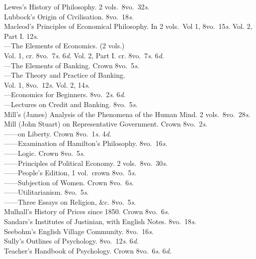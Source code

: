 \documentclass[letterpaper,12pt,oneside,openany]{memoir}
\newcommand{\D}{\hspace*{5mm}}
\newcommand{\E}{\hspace*{2mm}---\hspace*{2mm}}
\begin{document}
\begin{footnotesize}
Lewes's History of Philosophy. 2 vols.\ 8vo.\ 32\textit{s}.\\
Lubbock's Origin of Civilisation. 8vo.\ 18\textit{s}.\\
Macleod's Principles of Economical Philosophy. In 2 vols.\ Vol 1, 8vo.\ 15\textit{s}. Vol. 2, Part I. 12\textit{s}.\\
\E The Elements of Economics. (2 vols.)\\
\D\D Vol. 1, cr. 8vo.\ 7\textit{s}. 6\textit{d}. Vol. 2, Part I. cr. 8vo.\ 7\textit{s}. 6\textit{d}.\\
\E The Elements of Banking. Crown 8vo.\ 5\textit{s}.\\
\E The Theory and Practice of Banking.\\
\D\D Vol. 1, 8vo.\ 12\textit{s}. Vol. 2, 14\textit{s}.\\
\E Economics for Beginners. 8vo.\ 2\textit{s}. 6\textit{d}.\\
\E Lectures on Credit and Banking. 8vo.\ 5\textit{s}.\\
Mill's (James) Analysis of the Phenomena of the Human Mind. 2 vols.\ 8vo.\ 28\textit{s}.\\
Mill (John Stuart) on Representative Government. Crown 8vo.\ 2\textit{s}.\\
\E \E on Liberty. Crown 8vo.\ 1\textit{s}. 4\textit{d}.\\
\E \E Examination of Hamilton's Philosophy. 8vo.\ 16\textit{s}.\\
\E \E Logic. Crown 8vo.\ 5\textit{s}.\\
\E \E Principles of Political Economy. 2 vols.\ 8vo.\ 30\textit{s}. \\
\E \E People's Edition, 1 vol.\ crown 8vo.\ 5\textit{s}.\\
\E \E Subjection of Women. Crown 8vo.\ 6\textit{s}.\\
\E \E Utilitarianism. 8vo.\ 5\textit{s}.\\
\E \E Three Essays on Religion, \&c. 8vo.\ 5\textit{s}.\\
Mulhall's History of Prices since 1850. Crown 8vo.\ 6\textit{s}.\\
Sandars's Institutes of Justinian, with English Notes. 8vo.\ 18\textit{s}.\\
Seebohm's English Village Community. 8vo.\ 16\textit{s}.\\
Sully's Outlines of Psychology. 8vo.\ 12\textit{s}. 6\textit{d}.\\
\D Teacher's Handbook of Psychology. Crown 8vo.\ 6\textit{s}. 6\textit{d}.\\

\end{footnotesize}
\end{document}
